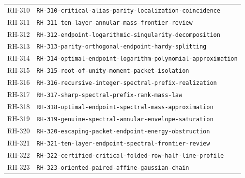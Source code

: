 \begin{longtable}{r >{\raggedright\arraybackslash}p{}}
RH-310 & \texttt{RH-\allowbreak{}310-\allowbreak{}critical-\allowbreak{}alias-\allowbreak{}parity-\allowbreak{}localization-\allowbreak{}coincidence}\\
RH-311 & \texttt{RH-\allowbreak{}311-\allowbreak{}ten-\allowbreak{}layer-\allowbreak{}annular-\allowbreak{}mass-\allowbreak{}frontier-\allowbreak{}review}\\
RH-312 & \texttt{RH-\allowbreak{}312-\allowbreak{}endpoint-\allowbreak{}logarithmic-\allowbreak{}singularity-\allowbreak{}decomposition}\\
RH-313 & \texttt{RH-\allowbreak{}313-\allowbreak{}parity-\allowbreak{}orthogonal-\allowbreak{}endpoint-\allowbreak{}hardy-\allowbreak{}splitting}\\
RH-314 & \texttt{RH-\allowbreak{}314-\allowbreak{}optimal-\allowbreak{}endpoint-\allowbreak{}logarithm-\allowbreak{}polynomial-\allowbreak{}approximation}\\
RH-315 & \texttt{RH-\allowbreak{}315-\allowbreak{}root-\allowbreak{}of-\allowbreak{}unity-\allowbreak{}moment-\allowbreak{}packet-\allowbreak{}isolation}\\
RH-316 & \texttt{RH-\allowbreak{}316-\allowbreak{}recursive-\allowbreak{}integer-\allowbreak{}spectral-\allowbreak{}prefix-\allowbreak{}realization}\\
RH-317 & \texttt{RH-\allowbreak{}317-\allowbreak{}sharp-\allowbreak{}spectral-\allowbreak{}prefix-\allowbreak{}rank-\allowbreak{}mass-\allowbreak{}law}\\
RH-318 & \texttt{RH-\allowbreak{}318-\allowbreak{}optimal-\allowbreak{}endpoint-\allowbreak{}spectral-\allowbreak{}mass-\allowbreak{}approximation}\\
RH-319 & \texttt{RH-\allowbreak{}319-\allowbreak{}genuine-\allowbreak{}spectral-\allowbreak{}annular-\allowbreak{}envelope-\allowbreak{}saturation}\\
RH-320 & \texttt{RH-\allowbreak{}320-\allowbreak{}escaping-\allowbreak{}packet-\allowbreak{}endpoint-\allowbreak{}energy-\allowbreak{}obstruction}\\
RH-321 & \texttt{RH-\allowbreak{}321-\allowbreak{}ten-\allowbreak{}layer-\allowbreak{}endpoint-\allowbreak{}spectral-\allowbreak{}frontier-\allowbreak{}review}\\
RH-322 & \texttt{RH-\allowbreak{}322-\allowbreak{}certified-\allowbreak{}critical-\allowbreak{}folded-\allowbreak{}row-\allowbreak{}half-\allowbreak{}line-\allowbreak{}profile}\\
RH-323 & \texttt{RH-\allowbreak{}323-\allowbreak{}oriented-\allowbreak{}paired-\allowbreak{}affine-\allowbreak{}gaussian-\allowbreak{}chain}\\

\end{longtable}
